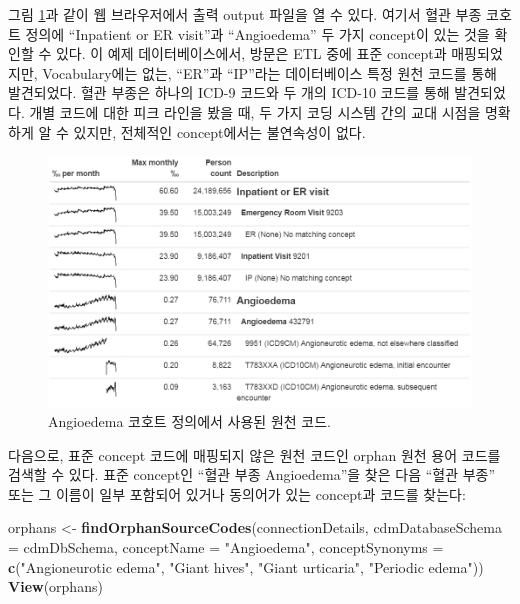 \documentclass[10.5pt]{book}
\newenvironment{Shaded}{\begin{snugshade}}{\end{snugshade}}
\newcommand{\KeywordTok}[1]{\textcolor[rgb]{0.13,0.29,0.53}{\textbf{#1}}}
\newcommand{\DataTypeTok}[1]{\textcolor[rgb]{0.13,0.29,0.53}{#1}}
\newcommand{\StringTok}[1]{\textcolor[rgb]{0.31,0.60,0.02}{#1}}
\newcommand{\NormalTok}[1]{#1}
\theoremstyle{definition}
\theoremstyle{definition}
\theoremstyle{definition}
\theoremstyle{remark}
\begin{document}
그림 \ref{fig:sourceCodesAngioedema}과 같이 웹 브라우저에서 출력 output
파일을 열 수 있다. 여기서 혈관 부종 코호트 정의에 ``Inpatient or ER
visit''과 ``Angioedema'' 두 가지 concept이 있는 것을 확인할 수 있다. 이
예제 데이터베이스에서, 방문은 ETL 중에 표준 concept과 매핑되었지만,
Vocabulary에는 없는, ``ER''과 ``IP''라는 데이터베이스 특정 원천 코드를
통해 발견되었다. 혈관 부종은 하나의 ICD-9 코드와 두 개의 ICD-10 코드를
통해 발견되었다. 개별 코드에 대한 피크 라인을 봤을 때, 두 가지 코딩
시스템 간의 교대 시점을 명확하게 알 수 있지만, 전체적인 concept에서는
불연속성이 없다.

\begin{figure}

{\centering \includegraphics[width=1\linewidth]{images/DataQuality/sourceCodesAngioedema} 

}

\caption{Angioedema 코호트 정의에서 사용된 원천 코드.}\label{fig:sourceCodesAngioedema}
\end{figure}

다음으로, 표준 concept 코드에 매핑되지 않은 원천 코드인 orphan 원천 용어
코드를 검색할 수 있다. 표준 concept인 ``혈관 부종 Angioedema''을 찾은
다음 ``혈관 부종'' 또는 그 이름이 일부 포함되어 있거나 동의어가 있는
concept과 코드를 찾는다:

\begin{Shaded}
\begin{Highlighting}[]
\NormalTok{orphans <-}\StringTok{ }\KeywordTok{findOrphanSourceCodes}\NormalTok{(connectionDetails,}
                                 \DataTypeTok{cdmDatabaseSchema =}\NormalTok{ cdmDbSchema,}
                                 \DataTypeTok{conceptName =} \StringTok{"Angioedema"}\NormalTok{,}
                                 \DataTypeTok{conceptSynonyms =} \KeywordTok{c}\NormalTok{(}\StringTok{"Angioneurotic edema"}\NormalTok{,}
                                                     \StringTok{"Giant hives"}\NormalTok{,}
                                                     \StringTok{"Giant urticaria"}\NormalTok{,}
                                                     \StringTok{"Periodic edema"}\NormalTok{))}
\KeywordTok{View}\NormalTok{(orphans)}
\end{Highlighting}
\end{Shaded}
\end{document}

